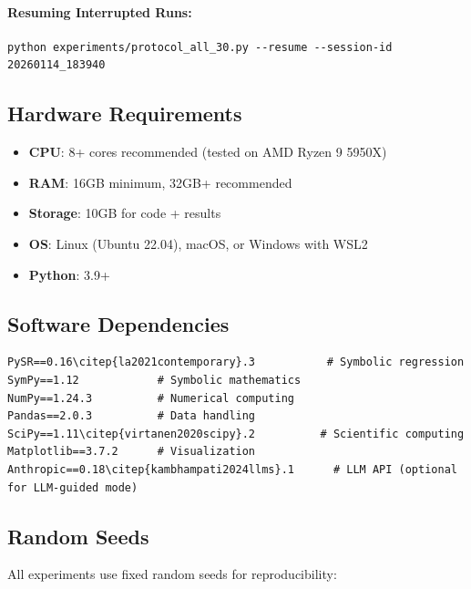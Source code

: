 \documentclass[twoside,11pt]{article}
\begin{document}
\paragraph{Resuming Interrupted Runs:}
\begin{small}
\begin{verbatim}
python experiments/protocol_all_30.py --resume --session-id 20260114_183940
\end{verbatim}
\end{small}

\subsection{Hardware Requirements}

\begin{itemize}
\item \textbf{CPU}: 8+ cores recommended (tested on AMD Ryzen 9 5950X)
\item \textbf{RAM}: 16GB minimum, 32GB+ recommended
\item \textbf{Storage}: 10GB for code + results
\item \textbf{OS}: Linux (Ubuntu 22.04), macOS, or Windows with WSL2
\item \textbf{Python}: 3.9+
\end{itemize}

\subsection{Software Dependencies}

\begin{small}
\begin{verbatim}
PySR==0.16\citep{la2021contemporary}.3           # Symbolic regression
SymPy==1.12            # Symbolic mathematics
NumPy==1.24.3          # Numerical computing
Pandas==2.0.3          # Data handling
SciPy==1.11\citep{virtanen2020scipy}.2          # Scientific computing
Matplotlib==3.7.2      # Visualization
Anthropic==0.18\citep{kambhampati2024llms}.1      # LLM API (optional for LLM-guided mode)
\end{verbatim}
\end{small}

\subsection{Random Seeds}

All experiments use fixed random seeds for reproducibility:
\end{document}
